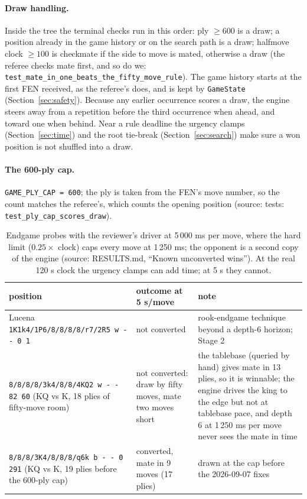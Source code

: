 \documentclass[11pt,a4paper]{article}
\newcommand{\src}[1]{{\small(source: #1)}}
\newcommand{\code}[1]{\texttt{#1}}
\begin{document}
\paragraph{Draw handling.} Inside the tree the terminal checks run in this order: ply $\geq 600$ is a draw;
a position already in the game history or on the search path is a draw; halfmove clock $\geq 100$ is
checkmate if the side to move is mated, otherwise a draw (the referee checks mate first, and so do we:
\code{test\_mate\_in\_one\_beats\_the\_fifty\_move\_rule}). The game history starts at the first FEN
received, as the referee's does, and is kept by \code{GameState} (Section~\ref{sec:safety}). Because any
earlier occurrence scores a draw, the engine steers away from a repetition before the third occurrence
when ahead, and toward one when behind. Near a rule deadline the urgency clamps
(Section~\ref{sec:time}) and the root tie-break (Section~\ref{sec:search}) make sure a won position is not
shuffled into a draw.
\paragraph{The 600-ply cap.} \code{GAME\_PLY\_CAP = 600}; the ply is taken from the FEN's move number, so
the count matches the referee's, which counts the opening position \src{tests: \code{test\_ply\_cap\_scores\_draw}}.

\begin{table}[H]\centering\small
\begin{tabular}{@{}>{\raggedright\arraybackslash}p{5.2cm}>{\raggedright\arraybackslash}p{2.5cm}>{\raggedright\arraybackslash}p{7.0cm}@{}}
\toprule
position & outcome at 5 s/move & note \\
\midrule
Lucena \code{1K1k4/1P6/8/8/8/8/r7/2R5 w - - 0 1} & not converted & rook-endgame technique beyond a depth-6 horizon; Stage 2 \\
\code{8/8/8/8/3k4/8/8/4KQ2 w - - 82 60} (KQ vs K, 18 plies of fifty-move room) & not converted: draw by fifty moves, mate two moves short & the tablebase (queried by hand) gives mate in 13 plies, so it is winnable; the engine drives the king to the edge but not at tablebase pace, and depth 6 at 1\,250 ms per move never sees the mate in time \\
\code{8/8/8/3K4/8/8/8/q6k b - - 0 291} (KQ vs K, 19 plies before the 600-ply cap) & converted, mate in 9 moves (17 plies) & drawn at the cap before the 2026-09-07 fixes \\
\bottomrule
\end{tabular}
\caption{Endgame probes with the reviewer's driver at 5\,000 ms per move, where the hard limit
($0.25 \times$ clock) caps every move at 1\,250 ms; the opponent is a second copy of the engine
\src{RESULTS.md, ``Known unconverted wins''}. At the real 120 s clock the urgency clamps can add time; at
5 s they cannot.}
\end{table}
\end{document}
